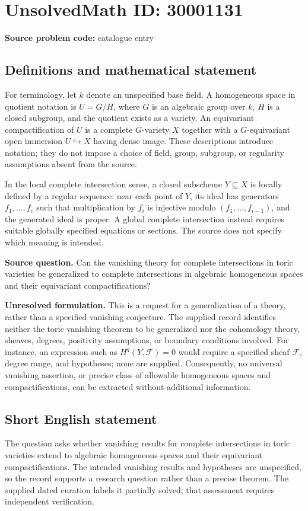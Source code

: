 \documentclass[11pt]{article}
\begin{document}
\section*{UnsolvedMath ID: 30001131}
\textbf{Source problem code:} catalogue entry
\subsection{Definitions and mathematical statement}
For terminology, let \(k\) denote an unspecified base field. A homogeneous space in quotient notation is \(U=G/H\), where \(G\) is an algebraic group over \(k\), \(H\) is a closed subgroup, and the quotient exists as a variety. An equivariant compactification of \(U\) is a complete \(G\)-variety \(X\) together with a \(G\)-equivariant open immersion \(U\hookrightarrow X\) having dense image. These descriptions introduce notation; they do not impose a choice of field, group, subgroup, or regularity assumptions absent from the source.

In the local complete intersection sense, a closed subscheme \(Y\subseteq X\) is locally defined by a regular sequence: near each point of \(Y\), its ideal has generators \(f_1,\ldots,f_c\) such that multiplication by \(f_i\) is injective modulo \((f_1,\ldots,f_{i-1})\), and the generated ideal is proper. A global complete intersection instead requires suitable globally specified equations or sections. The source does not specify which meaning is intended.

\textbf{Source question.} Can the vanishing theory for complete intersections in toric varieties be generalized to complete intersections in algebraic homogeneous spaces and their equivariant compactifications?

\textbf{Unresolved formulation.} This is a request for a generalization of a theory, rather than a specified vanishing conjecture. The supplied record identifies neither the toric vanishing theorem to be generalized nor the cohomology theory, sheaves, degrees, positivity assumptions, or boundary conditions involved. For instance, an expression such as \(H^q(Y,\mathcal F)=0\) would require a specified sheaf \(\mathcal F\), degree range, and hypotheses; none are supplied. Consequently, no universal vanishing assertion, or precise class of allowable homogeneous spaces and compactifications, can be extracted without additional information.
\subsection{Short English statement}
The question asks whether vanishing results for complete intersections in toric varieties extend to algebraic homogeneous spaces and their equivariant compactifications. The intended vanishing results and hypotheses are unspecified, so the record supports a research question rather than a precise theorem. The supplied dated curation labels it partially solved; that assessment requires independent verification.
\end{document}
